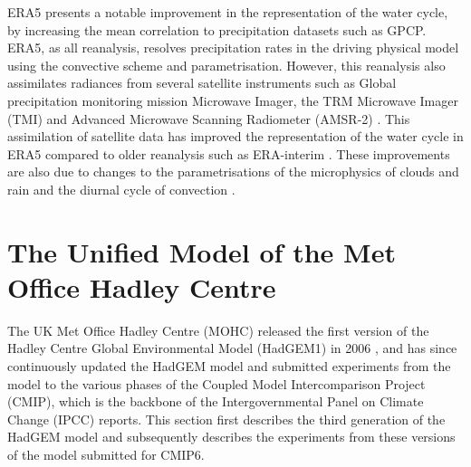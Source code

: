 ERA5 presents a notable improvement in the representation of the water cycle, by increasing the mean correlation to precipitation datasets such as GPCP. 
ERA5, as all reanalysis, resolves precipitation rates in the driving physical model using the convective scheme and parametrisation. However, this reanalysis also assimilates radiances from several satellite instruments such as Global precipitation monitoring mission Microwave Imager, the TRM Microwave Imager (TMI) and Advanced Microwave Scanning Radiometer (AMSR-2) \cite{era5hersbach}. This assimilation of satellite data has improved the representation of the water cycle in ERA5 compared to older reanalysis such as ERA-interim \citep[e.g.][]{henin2018assessing}. These improvements are also due to changes to the parametrisations of the microphysics of clouds and rain \citep{forbes2014} and the diurnal cycle of convection \citep{bechtold2014}. 



\section{The Unified Model of the Met Office Hadley Centre}\label{sq:modeldata}

The UK Met Office Hadley Centre (MOHC) released the first version of the Hadley Centre Global Environmental Model (HadGEM1) in 2006 \citep{johns2006}, and has since continuously updated the HadGEM model and submitted experiments from the model to the various phases of the Coupled Model Intercomparison Project (CMIP), which is the backbone of the Intergovernmental Panel on Climate Change (IPCC) reports. This section first describes the third generation of the HadGEM model and subsequently describes the experiments from these versions of the model submitted for CMIP6.  



